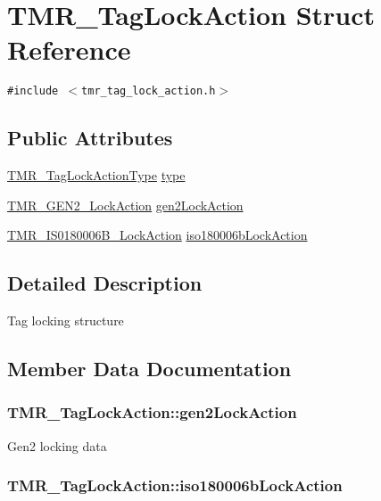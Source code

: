 \hypertarget{struct_t_m_r___tag_lock_action}{
\section{TMR\_\-TagLockAction Struct Reference}
\label{struct_t_m_r___tag_lock_action}
}
{\tt \#include $<$tmr\_\-tag\_\-lock\_\-action.h$>$}

\subsection*{Public Attributes}
\begin{CompactItemize}
\item 
\hyperlink{tmr__tag__lock__action_8h_9bed85006c57f9d418f4a8fba7dedf58}{TMR\_\-TagLockActionType} \hyperlink{struct_t_m_r___tag_lock_action_9950e948d530ebe539b9387133c0ebef}{type}
\item 
\hyperlink{struct_t_m_r___g_e_n2___lock_action}{TMR\_\-GEN2\_\-LockAction} \hyperlink{struct_t_m_r___tag_lock_action_16eb1de6d5474ae64ef81c335a057309}{gen2LockAction}
\item 
\hyperlink{struct_t_m_r___i_s_o180006_b___lock_action}{TMR\_\-IS0180006B\_\-LockAction} \hyperlink{struct_t_m_r___tag_lock_action_4c9958c70d38a662501addef7b012300}{iso180006bLockAction}
\end{CompactItemize}


\subsection{Detailed Description}
Tag locking structure 

\subsection{Member Data Documentation}
\hypertarget{struct_t_m_r___tag_lock_action_16eb1de6d5474ae64ef81c335a057309}{
\subsubsection[{gen2LockAction}]{ {\bf TMR\_\-TagLockAction::gen2LockAction}}}
\label{struct_t_m_r___tag_lock_action_16eb1de6d5474ae64ef81c335a057309}


Gen2 locking data \hypertarget{struct_t_m_r___tag_lock_action_4c9958c70d38a662501addef7b012300}{
\subsubsection[{iso180006bLockAction}]{ {\bf TMR\_\-TagLockAction::iso180006bLockAction}}}
\label{struct_t_m_r___tag_lock_action_4c9958c70d38a662501addef7b012300}



